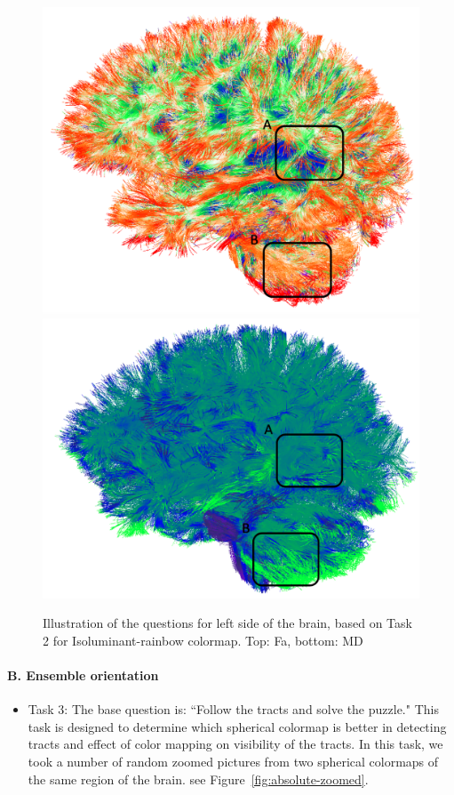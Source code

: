 \documentclass[hyperref, plainreport, noproblem]{cgvpub1}
\begin{document}
\begin{figure}[t]
	\centering
	\includegraphics[width=0.8\columnwidth]{isorainbow-fa-task2}
	\includegraphics[width=0.8\columnwidth]{isorainbow-md-task2}
	\caption{Illustration of the questions for left side of the brain, based on Task 2 for Isoluminant-rainbow colormap. Top: Fa, bottom: MD}
	\label{fig:task2}
\end{figure}


\paragraph{B. Ensemble orientation}

\begin{itemize}
\item{Task 3:} The base question is: ``Follow the tracts and solve the puzzle."
This task is designed to determine which spherical colormap is better in detecting tracts and effect of color mapping on visibility of the tracts. In this task, we took a number of random zoomed pictures from two spherical colormaps of the same region of the brain. see Figure~\ref{fig:absolute-zoomed}.
\end{itemize}
\end{document}
